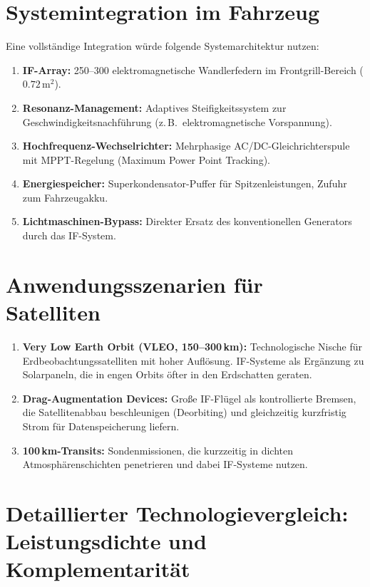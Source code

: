 ﻿\documentclass[12pt, a4paper]{report}
\theoremstyle{definition}
\theoremstyle{remark}
\begin{document}
\section{Systemintegration im Fahrzeug}

Eine vollständige Integration würde folgende Systemarchitektur nutzen:

\begin{enumerate}[leftmargin=2em]
  \item \textbf{IF-Array:} 250--300 elektromagnetische Wandlerfedern im
        Frontgrill-Bereich ($0.72\,\text{m}^2$).
  \item \textbf{Resonanz-Management:} Adaptives Steifigkeitssystem zur
        Geschwindigkeitsnachführung (z.\,B.\ elektromagnetische Vorspannung).
  \item \textbf{Hochfrequenz-Wechselrichter:} Mehrphasige AC/DC-Gleichrichterspule
        mit MPPT-Regelung (Maximum Power Point Tracking).
  \item \textbf{Energiespeicher:} Superkondensator-Puffer für Spitzenleistungen,
        Zufuhr zum Fahrzeugakku.
  \item \textbf{Lichtmaschinen-Bypass:} Direkter Ersatz des konventionellen
        Generators durch das IF-System.
\end{enumerate}

\section{Anwendungsszenarien für Satelliten}

\begin{enumerate}[leftmargin=2em]
  \item \textbf{Very Low Earth Orbit (VLEO, 150--300\,km):} Technologische
        Nische für Erdbeo\-bachtungs\-satelliten mit hoher Auflösung. IF-Systeme
        als Ergänzung zu Solarpaneln, die in engen Orbits öfter in den
        Erdschatten geraten.
  \item \textbf{Drag-Augmentation Devices:} Große IF-Flügel als kontrollierte
        Bremsen, die Satellitenabbau beschleunigen (Deorbiting) und gleichzeitig
        kurzfristig Strom für Datenspeicherung liefern.
  \item \textbf{100\,km-Transits:} Sondenmissionen, die kurzzeitig in dichten
        Atmosphärenschichten penetrieren und dabei IF-Systeme nutzen.
\end{enumerate}

\section{Detaillierter Technologievergleich: Leistungsdichte und Komplementarität}
\label{sec:vergleich_leistungsdichte}
\end{document}
